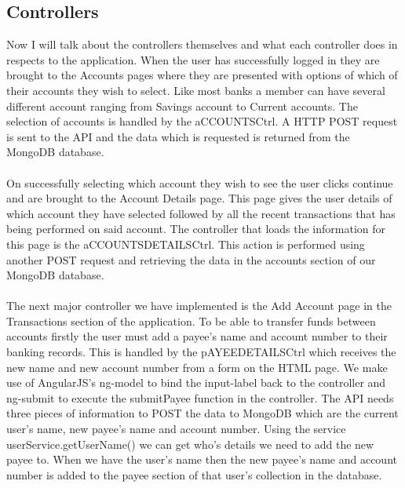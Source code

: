 \subsection{Controllers}
Now I will talk about the controllers themselves and what each controller does in respects to the application. When the user has successfully logged in they are brought to the Accounts pages where they are presented with options of which of their accounts they wish to select. Like most banks a member can have several different account ranging from Savings account to Current accounts.  The selection of accounts is handled by the aCCOUNTSCtrl. A HTTP POST request is sent to the API and the data which is requested is returned from the MongoDB database.\paragraph{}

On successfully selecting which account they wish to see the user clicks continue and are brought to the Account Details page. This page gives the user details of which account they have selected followed by all the recent transactions that has being performed on said account. The controller that loads the information for this page is the aCCOUNTSDETAILSCtrl. This action is performed using another POST request and retrieving the data in the accounts section of our MongoDB database.\paragraph{}

The next major controller we have implemented is the Add Account page in the Transactions section of the application. To be able to transfer funds between accounts firstly the user must add a payee’s name and account number to their banking records. This is handled by the pAYEEDETAILSCtrl which receives the new name and new account number from a form on the HTML page. We make use of AngularJS’s ng-model to bind the input-label back to the controller and ng-submit to execute the submitPayee function in the controller. The API needs three pieces of information to POST the data to MongoDB which are the current user’s name, new payee’s name and account number. Using the service userService.getUserName() we can get who’s details we need to add the new payee to. When we have the user’s name then the new payee’s name and account number is added to the payee section of that user’s collection in the database.\paragraph{}

